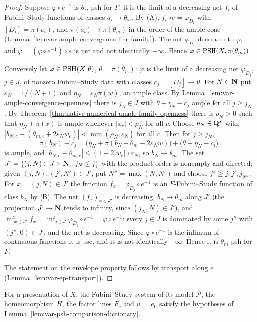 \begin{proof}
Suppose $\varphi\circ e^{-1}$ is $\theta_m$-psh for $F$: it is the limit of a decreasing net
$f_i$ of Fubini--Study functions of classes $a_i\to\theta_m$. By (A), $f_i\circ e=\varphi_{D_i}$
with $[D_i]=\pi(a_i)$, and $\pi(a_i)\to\pi(\theta_m)$ in the order of the ample cone
(Lemma~\ref{lem:var-ample-convergence-line-family}). The net $\varphi_{D_i}$ decreases to
$\varphi$, and $\varphi=(\varphi\circ e^{-1})\circ e$ is usc and not identically $-\infty$.
Hence $\varphi\in\operatorname{PSH}(X,\pi(\theta_m))$.

Conversely let $\varphi\in\operatorname{PSH}(X,\theta)$, $\theta=\pi(\theta_m)$: $\varphi$ is the limit of a
decreasing net $\varphi_{D_j}$, $j\in J$, of nonzero Fubini--Study data with classes
$c_j=[D_j]\to\theta$. For $N\in\mathbf{N}$ put $\varepsilon_N=1/(N+1)$ and
$\eta_N=\varepsilon_N\pi(w)$, an ample class. By
Lemma~\ref{lem:var-ample-convergence-openness} there is $j_N\in J$ with $\theta+\eta_N-c_j$
ample for all $j\ge j_N$. By Theorem~\ref{thm:native-numerical-ample-family-openness} there is
$\rho_N>0$ such that $\eta_N+\pi(x)$ is ample whenever $|x_c|<\rho_N$ for all $c$. Choose
$b_N\in\mathbf{Q}^s$ with $|b_{N,c}-(\theta_{m,c}+2\varepsilon_Nw_c)|<\min(\rho_N,\varepsilon_N)$ for
all $c$. Then for $j\ge j_N$,
\[
 \pi(b_N)-c_j=\bigl(\eta_N+\pi(b_N-\theta_m-2\varepsilon_Nw)\bigr)+\bigl(\theta+\eta_N-c_j\bigr)
\]
is ample, and $|b_{N,c}-\theta_{m,c}|\le(1+2|w_c|)\varepsilon_N$, so $b_N\to\theta_m$. The set
$J'=\{(j,N)\in J\times\mathbf{N} : j_N\le j\}$ with the product order is nonempty and directed: given
$(j,N),(j',N')\in J'$, put $N''=\max(N,N')$ and choose $j''\ge j,j',j_{N''}$. For
$x=(j,N)\in J'$ the function $f_x=\varphi_{D_j}\circ e^{-1}$ is an $F$-Fubini--Study function of
class $b_N$ by (B). The net $(f_x)_{x\in J'}$ is decreasing, $b_N\to\theta_m$ along $J'$ (the
projection $J'\to\mathbf{N}$ tends to infinity, since $(j_N,N)\in J'$), and
$\inf_{x\in J'}f_x=\inf_{j\in J}\varphi_{D_j}\circ e^{-1}=\varphi\circ e^{-1}$: every $j\in J$ is
dominated by some $j''$ with $(j'',0)\in J'$, and the net is decreasing. Since
$\varphi\circ e^{-1}$ is the infimum of continuous functions it is usc, and it is not
identically $-\infty$. Hence it is $\theta_m$-psh for $F$.

The statement on the envelope property follows by transport along $e$
(Lemma~\ref{lem:var-ep-transport}).
\end{proof}

\begin{lemma}
\label{lem:var-presentation-fs-transfer}
\leanok
{}
For a presentation of $X$, the Fubini--Study system of its model $\mathcal P$, the homeomorphism
$H$, the factor lines $F_c$ and $w=e_0$ satisfy the hypotheses of
Lemma~\ref{lem:var-psh-comparison-dictionary}.
\end{lemma}

